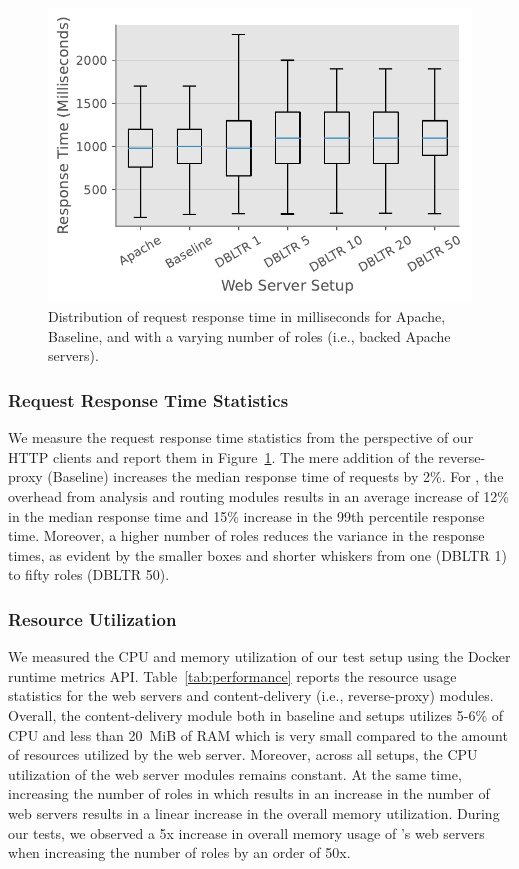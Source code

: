 \begin{figure}[]
    \centering
    \includegraphics[width=0.55
    \textwidth]{figures/dbltr/performance.pdf}
    \caption{Distribution of request response time in milliseconds for Apache, Baseline, and \dbltr{} with a varying number of roles (i.e., backed Apache servers).}
    \label{fig:performance}
  \end{figure}

\subsubsection{Request Response Time Statistics}
We measure the request response time statistics from the perspective of our HTTP clients and report them in Figure~\ref{fig:performance}. 
The mere addition of the reverse-proxy (Baseline) increases the median response time of requests by 2\%. 
For \dbltr{}, the overhead from analysis and routing modules results in an average increase of 12\% in the median response time and 15\% increase in the 99th percentile response time. 
Moreover, a higher number of roles reduces the variance in the response times, as evident by the smaller boxes and shorter whiskers from one (DBLTR 1) to fifty roles (DBLTR 50). 

\subsubsection{Resource Utilization}
We measured the CPU and memory utilization of our test setup using the Docker runtime metrics API. 
Table~\ref{tab:performance} reports the resource usage statistics for the web servers and content-delivery (i.e., reverse-proxy) modules. 
Overall, the content-delivery module both in baseline and \dbltr{} setups utilizes 5-6\% of CPU and less than 20~MiB of RAM which is very small compared to the amount of resources utilized by the web server. 
Moreover, across all setups, the CPU utilization of the web server modules remains constant. 
At the same time, increasing the number of roles in \dbltr{} which results in an increase in the number of web servers results in a linear increase in the overall memory utilization. 
During our tests, we observed a 5x increase in overall memory usage of \dbltr{}'s web servers when increasing the number of roles by an order of 50x. 

